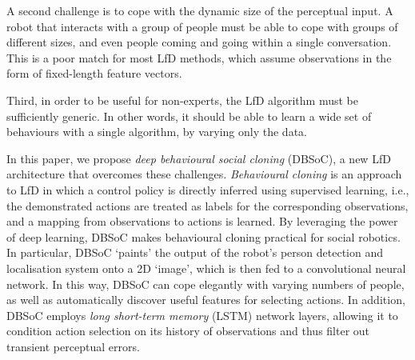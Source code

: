 \documentclass[letterpaper, 10 pt, conference]{ieeeconf}
\begin{document}
A second challenge is to cope with the dynamic size of the perceptual input.  A robot that interacts with a group of people must be able to cope with groups of different sizes, and even people coming and going within a single conversation.  This is a poor match for most LfD methods, which assume observations in the form of fixed-length feature vectors.

Third, in order to be useful for non-experts, the LfD algorithm must be sufficiently generic. In other words, it should be able to learn a wide set of behaviours with a single algorithm, by varying only the data. 



In this paper, we propose \emph{deep behavioural social cloning} (DBSoC), a new LfD architecture that overcomes these challenges.  \emph{Behavioural cloning} is an approach to LfD in which a control policy is directly inferred using supervised learning, i.e., the demonstrated actions are treated as labels for the corresponding observations, and a mapping from observations to actions is learned.  By leveraging the power of deep learning, DBSoC makes behavioural cloning practical for social robotics.  In particular, DBSoC `paints' the output of the robot's person detection and localisation system onto a 2D `image', which is then fed to a convolutional neural network.  In this way, DBSoC can cope elegantly with varying numbers of people, as well as automatically discover useful features for selecting actions.  In addition, DBSoC employs \emph{long short-term memory} (LSTM) \cite{hochreiter1997long} network layers, allowing it to condition action selection on its history of observations and thus filter out transient perceptual errors.
\end{document}
